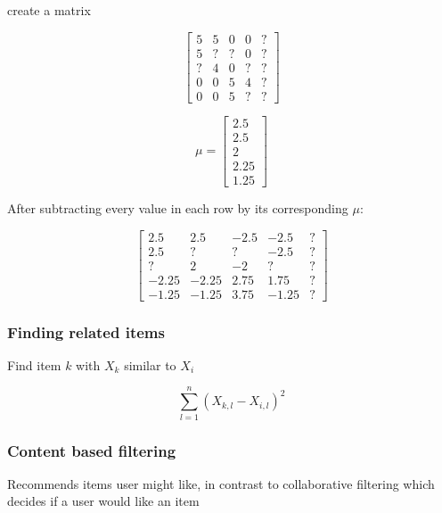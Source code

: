 \documentclass[12pt]{article}
\begin{document}
create a matrix

\[
\begin{bmatrix}
    5 & 5 & 0 & 0 & ?\\
    5 & ? & ? & 0 & ?\\
    ? & 4 & 0 & ? & ?\\
    0 & 0 & 5 & 4 & ?\\
    0 & 0 & 5 & ? & ?
\end{bmatrix}
\]

\[
    \mu =
    \begin{bmatrix}
        2.5\\
        2.5\\
        2\\
        2.25\\
        1.25
    \end{bmatrix}
\]

After subtracting every value in each row by its corresponding $\mu$:

\[
    \begin{bmatrix}
        2.5 & 2.5 & -2.5 & -2.5 & ?\\
        2.5 & ? & ? & -2.5 & ?\\
        ? & 2 & -2 & ? & ?\\
        -2.25 & -2.25 & 2.75 & 1.75 & ?\\
        -1.25 & -1.25 & 3.75 & -1.25 & ?
    \end{bmatrix}
\]

\subsubsection{Finding related items}

Find item $k$ with $X_k$ similar to $X_i$

\[ \sum_{l=1}^n (X_{k,l} - X_{i,l})^2 \]

\subsubsection{Content based filtering}

Recommends items user might like, in contrast to collaborative filtering which decides if a user
would like an item
\end{document}
